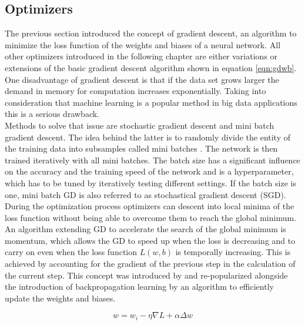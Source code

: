 \subsection{Optimizers}
The previous section introduced the concept of gradient descent, an algorithm to minimize
the loss function of the weights and biases of a neural network. All other optimizers
introduced in
the following chapter are either variations or extensions of the basic gradient descent algorithm shown in equation \ref{eqn:gdwb}. \\
One disadvantage of gradient descent is that if the data set grows larger the demand in
memory for computation increases exponentially. Taking into consideration that machine
learning is a popular method in big data applications this is a serious drawback.\\
Methods to solve that issue are stochastic gradient descent and mini batch gradient
descent. The idea behind the latter is to randomly divide the entity of the training data
into subsamples called mini batches \cite{bottou-bousquet-2008}. The network is then
trained iteratively with all mini batches. The batch size has a significant influence on
the accuracy and the training speed of the network and is a hyperparameter, which has to
be tuned by iteratively testing different settings. If
the batch size is one, mini batch GD is also referred to as stochastical gradient descent (SGD). \\
During the optimization process optimizers can descent into local minima of the loss
function without being able to overcome them to reach the global minimum. An
algorithm extending GD to accelerate the search of the global minimum is momentum, which
allows the GD to speed up when the loss is decreasing and to carry on even when the loss
function $L(w,b)$ is temporally increasing. This is achieved by accounting for the
gradient of the previous step in the calculation of the current step. This concept was
introduced by \cite{polyak1964} and re-popularized alongside the introduction of
backpropagation learning by \cite{rumelhart1988learning} an algorithm to efficiently
update the weights and biases.

\begin{equation}
 w = w_i - \eta \nabla L + \alpha \Delta w
 \label{eqn:momentum}
\end{equation}

